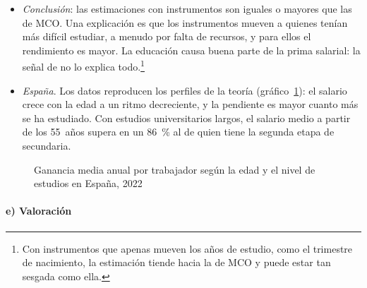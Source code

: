 \documentclass[11pt]{article}
\begin{document}
\begin{itemize}
\begin{itemize}
  \item \emph{gemelos idénticos}: comparten genes y familia, así que la diferencia de salario entre el que estudia más y el que estudia menos no se debe a la habilidad heredada. \textcite{AshenfelterKrueger1994Estimates} estiman un rendimiento del 12-16~\% por año;\footnote{El método de los gemelos tiene su propio problema: si son idénticos, ¿por qué estudian distinto? Si la diferencia se debe a algo que también influye en sus ingresos (preguntados, algunos responden que uno era «mejor con los libros»), el rendimiento estimado sigue sesgado\nocite{Borjas2020Labor}.}
  \item \emph{efecto medio local}: \textcite{ImbensAngrist1994Identification} muestran que, si el rendimiento cambia de una persona a otra, la variable instrumental mide el de quienes cambian su decisión por el instrumento (\emph{local average treatment effect}, LATE), no el de toda la población.
  \end{itemize}
\item \emph{Conclusión}: las estimaciones con instrumentos son iguales o mayores que las de MCO\nocite{Card1999Causal,Card2001Estimating}. Una explicación es que los instrumentos mueven a quienes tenían más difícil estudiar, a menudo por falta de recursos, y para ellos el rendimiento es mayor. La educación causa buena parte de la prima salarial: la señal de  no lo explica todo.\footnote{Con instrumentos que apenas mueven los años de estudio, como el trimestre de nacimiento, la estimación tiende hacia la de MCO y puede estar tan sesgada como ella\nocite{BoundJaegerBaker1995Problems}.}
\item \emph{España}. Los datos reproducen los perfiles de la teoría (gráfico~\ref{fig:ees-edad-estudios}): el salario crece con la edad a un ritmo decreciente, y la pendiente es mayor cuanto más se ha estudiado. Con estudios universitarios largos, el salario medio a partir de los 55~años supera en un 86~\% al de quien tiene la segunda etapa de secundaria\nocite{INE2024EES2022}.
\end{itemize}

\begin{figure}[H]
\centering
\caption{Ganancia media anual por trabajador según la edad y el nivel de estudios en España, 2022}\label{fig:ees-edad-estudios}
\end{figure}

\paragraph{e) Valoración}
\end{document}
